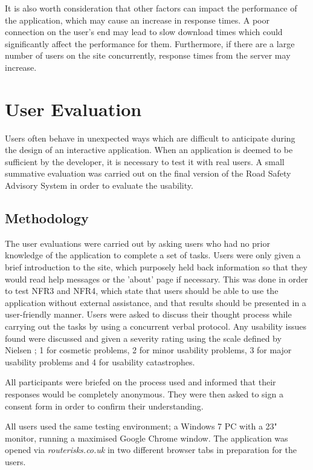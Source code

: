 \documentclass[authoryearcitations]{UoYCSproject}
\begin{document}
It is also worth consideration that other factors can impact the performance of the application, which may cause an increase in response times. A poor connection on the user's end may lead to slow download times which could significantly affect the performance for them. Furthermore, if there are a large number of users on the site concurrently, response times from the server may increase.

\section{User Evaluation}

Users often behave in unexpected ways which are difficult to anticipate during the design of an interactive application. When an application is deemed to be sufficient by the developer, it is necessary to test it with real users. A small summative evaluation was carried out on the final version of the Road Safety Advisory System in order to evaluate the usability. 

\subsection{Methodology}

The user evaluations were carried out by asking users who had no prior knowledge of the application to complete a set of tasks. Users were only given a brief introduction to the site, which purposely held back information so that they would read help messages or the 'about' page if necessary. This was done in order to test NFR3 and NFR4, which state that users should be able to use the application without external assistance, and that results should be presented in a user-friendly manner. Users were asked to discuss their thought process while carrying out the tasks by using a concurrent verbal protocol. Any usability issues found were discussed and given a severity rating using the scale defined by Nielsen \citep{Nielsen1995}; 1 for cosmetic problems, 2 for minor usability problems, 3 for major usability problems and 4 for usability catastrophes.

All participants were briefed on the process used and informed that their responses would be completely anonymous. They were then asked to sign a consent form in order to confirm their understanding. 

All users used the same testing environment; a Windows 7 PC with a 23" monitor, running a maximised Google Chrome window. The application was opened via \textit{routerisks.co.uk} in two different browser tabs in preparation for the users.
\end{document}
